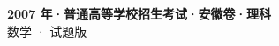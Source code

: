 \documentclass[zihao=-4, a4paper]{ctexart}
\begin{document}
\begin{center}
  {\Large\bfseries 2007 年·普通高等学校招生考试·安徽卷·理科}\\[4pt]
  {\large 数学 · 试题版}
\end{center}
\medskip
{}

\end{document}
